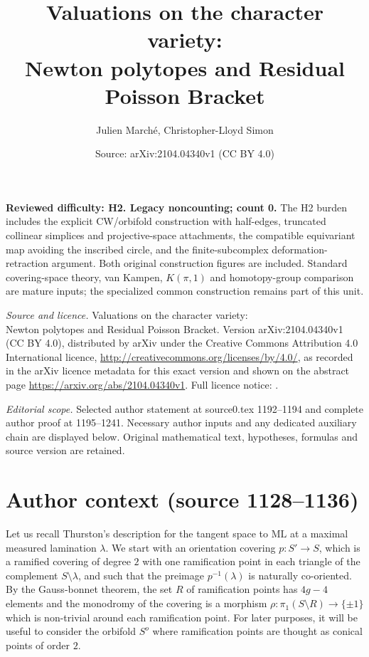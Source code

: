 \documentclass[10pt,a4paper]{amsart}
\title[Author proof 110108]{Valuations on the character variety: \\ Newton polytopes and Residual Poisson Bracket}
\author{Julien March\'e, Christopher-Lloyd Simon}
\date{Source: arXiv:2104.04340v1 (CC BY 4.0)}
\newcommand{\ML}{\mathrm{ML}}
\begin{document}
\maketitle
\noindent\textbf{Reviewed difficulty: H2. Legacy noncounting; count 0.} The H2 burden includes the explicit CW/orbifold construction with half-edges, truncated collinear simplices and projective-space attachments, the compatible equivariant map avoiding the inscribed circle, and the finite-subcomplex deformation-retraction argument. Both original construction figures are included. Standard covering-space theory, van Kampen, $K(\pi,1)$ and homotopy-group comparison are mature inputs; the specialized common construction remains part of this unit.\par\medskip

\noindent\emph{Source and licence.} Valuations on the character variety: \\ Newton polytopes and Residual Poisson Bracket. Version arXiv:2104.04340v1 (CC BY 4.0), distributed by arXiv under the Creative Commons Attribution 4.0 International licence, \url{http://creativecommons.org/licenses/by/4.0/}, as recorded in the arXiv licence metadata for this exact version and shown on the abstract page \url{https://arxiv.org/abs/2104.04340v1}. Full licence notice: .\par\smallskip


\noindent\textit{Editorial scope.} Selected author statement at source0.tex 1192--1194 and complete author proof at 1195--1241. Necessary author inputs and any dedicated auxiliary chain are displayed below. Original mathematical text, hypotheses, formulas and source version are retained.\par\smallskip
\section*{Author context (source 1128--1136)}
Let us recall Thurston's description for the tangent space to $\ML$ at a maximal measured lamination $\lambda$. We start with an orientation covering $p\colon S'\to S$, which is a ramified covering of degree $2$ with one ramification point in each triangle of the complement $S\setminus \lambda$, and such that the preimage $p^{-1}(\lambda)$ is naturally co-oriented. By the Gauss-bonnet theorem, the set $R$ of ramification points has $4g-4$ elements and the monodromy of the covering is a morphism $\rho\colon \pi_1(S\setminus R)\to\{\pm 1\}$ which is non-trivial around each ramification point. For later purposes, it will be useful to consider the orbifold $S^o$ where ramification points are thought as conical points of order $2$.
\end{document}
